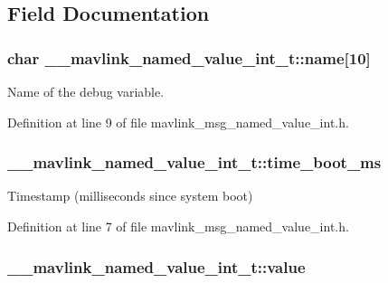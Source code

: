 \subsection{Field Documentation}
\hypertarget{struct____mavlink__named__value__int__t_acd99d286e407b448288e54c586229d66}{
\subsubsection[{name}]{\setlength{\rightskip}{0pt plus 5cm}char \-\_\-\-\_\-mavlink\-\_\-named\-\_\-value\-\_\-int\-\_\-t\-::name\mbox{[}10\mbox{]}}}\label{struct____mavlink__named__value__int__t_acd99d286e407b448288e54c586229d66}


Name of the debug variable. 



Definition at line 9 of file mavlink\-\_\-msg\-\_\-named\-\_\-value\-\_\-int.\-h.

\hypertarget{struct____mavlink__named__value__int__t_ab9e1d97f4b6a53bac6086743223c4249}{
\subsubsection[{time\-\_\-boot\-\_\-ms}]{ \-\_\-\-\_\-mavlink\-\_\-named\-\_\-value\-\_\-int\-\_\-t\-::time\-\_\-boot\-\_\-ms}}\label{struct____mavlink__named__value__int__t_ab9e1d97f4b6a53bac6086743223c4249}


Timestamp (milliseconds since system boot) 



Definition at line 7 of file mavlink\-\_\-msg\-\_\-named\-\_\-value\-\_\-int.\-h.

\hypertarget{struct____mavlink__named__value__int__t_ab6bdae0f70ba0c8bece0d206c0075fef}{
\subsubsection[{value}]{ \-\_\-\-\_\-mavlink\-\_\-named\-\_\-value\-\_\-int\-\_\-t\-::value}}\label{struct____mavlink__named__value__int__t_ab6bdae0f70ba0c8bece0d206c0075fef}


